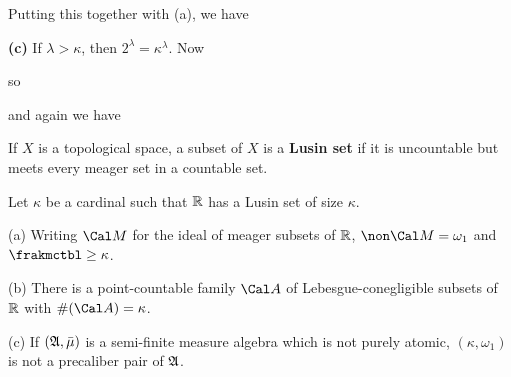 {

\noindent Putting this together with (a), we have


\medskip

{\bf (c)} If $\lambda>\kappa$, then
$2^{\lambda}=\kappa^{\lambda}$.   Now


\noindent so


\noindent and again we have

}%

 If $X$ is a topological space, a subset of $X$
is a {\bf Lusin set} if it is uncountable but meets every meager set
in a countable set.

Let $\kappa$ be a cardinal such that $\Bbb R$ has a
Lusin set of size $\kappa$.

(a) Writing $\Cal M$ for the ideal of meager subsets of $\Bbb R$,
$\non\Cal M=\omega_1$ and $\frakmctbl\ge\kappa$.

(b) There is a point-countable family $\Cal A$ of
Lebesgue-conegligible subsets of $\Bbb R$ with $\#(\Cal A)=\kappa$.

(c) If $(\frak A,\bar\mu)$ is a semi-finite measure algebra which is not
purely atomic, $(\kappa,\omega_1)$ is not a precaliber pair of $\frak A$.

